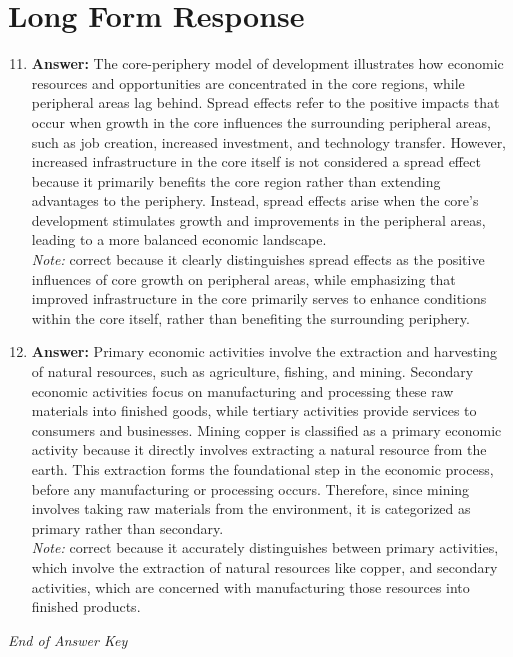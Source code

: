 \documentclass[12pt]{article}
\begin{document}
\section*{Long Form Response}
\begin{enumerate}[label=\arabic*.]
\setcounter{enumi}{10}
\item \textbf{Answer:} The core-periphery model of development illustrates how economic resources and opportunities are concentrated in the core regions, while peripheral areas lag behind. Spread effects refer to the positive impacts that occur when growth in the core influences the surrounding peripheral areas, such as job creation, increased investment, and technology transfer. However, increased infrastructure in the core itself is not considered a spread effect because it primarily benefits the core region rather than extending advantages to the periphery. Instead, spread effects arise when the core's development stimulates growth and improvements in the peripheral areas, leading to a more balanced economic landscape.
\\ \textit{Note:} correct because it clearly distinguishes spread effects as the positive influences of core growth on peripheral areas, while emphasizing that improved infrastructure in the core primarily serves to enhance conditions within the core itself, rather than benefiting the surrounding periphery.
\item \textbf{Answer:} Primary economic activities involve the extraction and harvesting of natural resources, such as agriculture, fishing, and mining. Secondary economic activities focus on manufacturing and processing these raw materials into finished goods, while tertiary activities provide services to consumers and businesses. Mining copper is classified as a primary economic activity because it directly involves extracting a natural resource from the earth. This extraction forms the foundational step in the economic process, before any manufacturing or processing occurs. Therefore, since mining involves taking raw materials from the environment, it is categorized as primary rather than secondary.
\\ \textit{Note:} correct because it accurately distinguishes between primary activities, which involve the extraction of natural resources like copper, and secondary activities, which are concerned with manufacturing those resources into finished products.
\end{enumerate}

\vfill
\noindent\textit{End of Answer Key}
\end{document}
